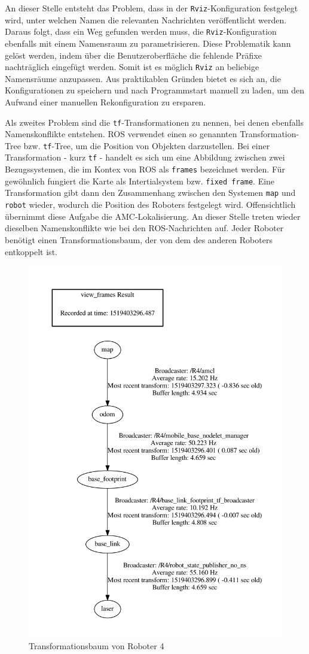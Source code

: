An dieser Stelle entsteht das Problem, dass in der \lstinline{Rviz}{}-Konfiguration festgelegt wird, unter welchen Namen die relevanten Nachrichten veröffentlicht werden. Daraus folgt, dass ein Weg gefunden werden muss, die \lstinline{Rviz}{}-Konfiguration ebenfalls mit einem Namensraum zu parametrisieren.
Diese Problematik kann gelöst werden, indem über die Benutzeroberfläche die fehlende Präfixe nachträglich eingefügt werden. Somit ist es möglich \lstinline{Rviz}{} an beliebige Namensräume anzupassen. Aus praktikablen Gründen bietet es sich an, die Konfigurationen zu speichern und nach Programmstart manuell zu laden, um den Aufwand einer manuellen Rekonfiguration zu ersparen.

Als zweites Problem sind die \lstinline{tf}{}-Transformationen zu nennen, bei denen ebenfalls Namenskonflikte entstehen. ROS verwendet einen so genannten Transformation-Tree bzw. \lstinline{tf}{}-Tree, um die Position von Objekten darzustellen. Bei einer Transformation - kurz \lstinline{tf}{} - handelt es sich um eine Abbildung zwischen zwei Bezugssystemen, die im Kontex von ROS als \lstinline{frames}{} bezeichnet werden. Für gewöhnlich fungiert die Karte als Intertialsystem bzw. \lstinline{fixed frame}{}. Eine Transformation gibt dann den Zusammenhang zwischen den Systemen \lstinline{map}{} und \lstinline{robot}{} wieder, wodurch die Position des Roboters festgelegt wird. Offensichtlich übernimmt diese Aufgabe die AMC-Lokalisierung. An dieser Stelle treten wieder dieselben Namenskonflikte wie bei den ROS-Nachrichten auf. Jeder Roboter benötigt einen Transformationsbaum, der von dem des anderen Roboters entkoppelt ist.
\begin{figure}[!ht]
\centering
\includegraphics[width=0.4\linewidth, trim={3.5cm 1cm 1cm 5cm},clip]{img/TF_Tree_no_NS.pdf}
\caption{Transformationsbaum von Roboter 4}
\end{figure}
